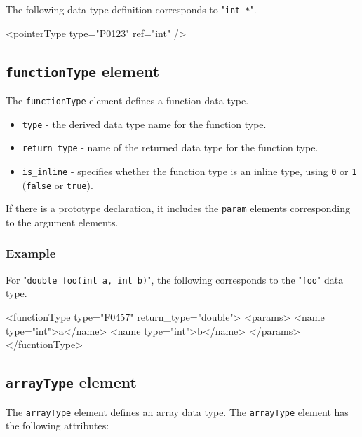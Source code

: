 The following data type definition corresponds to "{\tt int *}".
\vspace{2mm}

\begin{XcodeMLExample}
  <pointerType type="P0123" ref="int" />
\end{XcodeMLExample}


\subsection{ {\tt functionType} element}

The {\tt functionType} element defines a function data type.

\begin{itemize}
\item {\tt type} - the derived data type name for the function type.
\item {\tt return\_type} - name of the returned data type for the function type.
\item {\tt is\_inline} - specifies whether the function type is an inline type, using {\tt 0} or {\tt 1} ({\tt false} or {\tt true}).
\end{itemize}

If there is a prototype declaration, it includes the {\tt param} elements corresponding to the argument elements.

\subsubsection*{Example}

For "{\tt double foo(int a, int b)}", the following corresponds to the "{\tt foo}" data type.
\vspace{2mm}

\begin{XcodeMLExample}
  <functionType type="F0457" return_type="double">
  <params>
      <name type="int">a</name>
      <name type="int">b</name>
    </params>
  </fucntionType>
\end{XcodeMLExample}


\subsection{ {\tt arrayType} element}

The {\tt arrayType} element defines an array data type. The {\tt arrayType} element has the following attributes:

